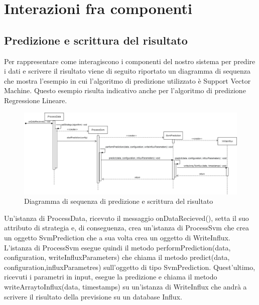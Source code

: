 \section{Interazioni fra componenti}
	\subsection{Predizione e scrittura del risultato}
	Per rappresentare come interagiscono i componenti del nostro sistema per predire i dati e scrivere il risultato viene di seguito riportato un diagramma di sequenza che mostra l'esempio in cui l'algoritmo di predizione utilizzato è Support Vector Machine. Questo esempio risulta indicativo anche per l'algoritmo di predizione Regressione Lineare.  
	\mbox{}
	\begin{figure} [H]
		\includegraphics[width=\linewidth]{./img/Diagrammi/ds1.png}
		\caption{Diagramma di sequenza di predizione e scrittura del risultato}
	\end{figure}
	Un'istanza di ProcessData, ricevuto il messaggio onDataRecieved(), setta il suo attributo di strategia e, di conseguenza, crea un'istanza di ProcessSvm che crea un oggetto SvmPrediction che a sua volta crea un oggetto di WriteInflux.
	L'istanza di ProcessSvm esegue quindi il metodo performPrediction(data, configuration, writeInfluxParameters) che chiama il metodo predict(data, configuration,influxParametres) sull'oggetto di tipo SvmPrediction. Quest'ultimo, ricevuti i parametri in input, esegue la predizione e chiama il metodo writeArraytoInflux(data, timestamps) su un'istanza di WriteInflux che andrà a scrivere il risultato della previsione su un database Influx.
	
